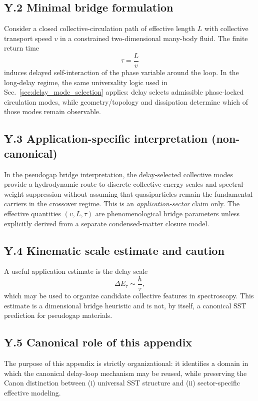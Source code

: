 \documentclass[10pt]{article}
\begin{document}
    \subsection*{Y.2 Minimal bridge formulation}
    Consider a closed collective-circulation path of effective length \(L\) with collective transport speed \(v\) in a constrained two-dimensional many-body fluid.
    The finite return time
    \begin{equation}
        \tau = \frac{L}{v}
    \end{equation}
    induces delayed self-interaction of the phase variable around the loop.
    In the long-delay regime, the same universality logic used in Sec.~\ref{sec:delay_mode_selection} applies:
    delay selects admissible phase-locked circulation modes, while geometry/topology and dissipation determine which of those modes remain observable.

    \subsection*{Y.3 Application-specific interpretation (non-canonical)}
    In the pseudogap bridge interpretation, the delay-selected collective modes provide a hydrodynamic route to discrete collective energy scales and spectral-weight suppression without assuming that quasiparticles remain the fundamental carriers in the crossover regime.
    This is an \emph{application-sector} claim only.
    The effective quantities \((v,L,\tau)\) are phenomenological bridge parameters unless explicitly derived from a separate condensed-matter closure model.

    \subsection*{Y.4 Kinematic scale estimate and caution}
    A useful application estimate is the delay scale
    \begin{equation}
        \Delta E_{\tau} \sim \frac{h}{\tau},
    \end{equation}
    which may be used to organize candidate collective features in spectroscopy.
    This estimate is a dimensional bridge heuristic and is not, by itself, a canonical SST prediction for pseudogap materials.

    \subsection*{Y.5 Canonical role of this appendix}
    The purpose of this appendix is strictly organizational:
    it identifies a domain in which the canonical delay-loop mechanism may be reused, while preserving the Canon distinction between
    (i) universal SST structure and
    (ii) sector-specific effective modeling.


        
\end{document}
